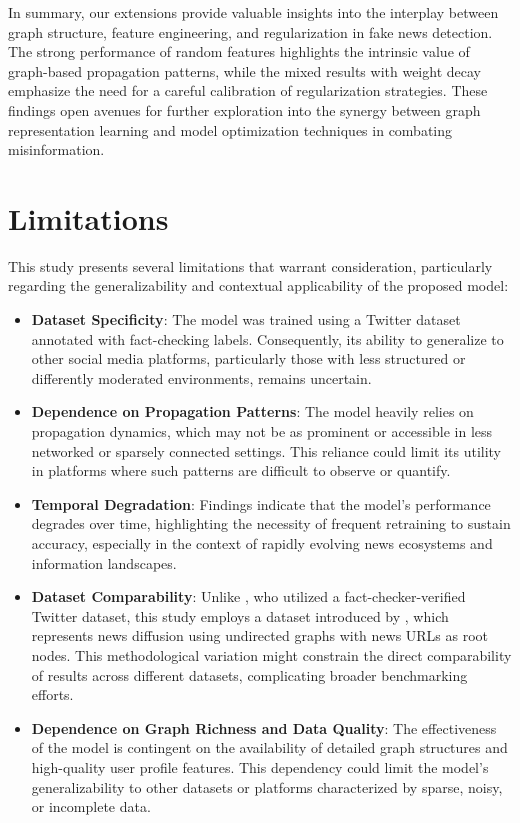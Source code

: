 \documentclass[sigconf,nonacm]{acmart}
\begin{document}
\vspace{1em} %

In summary, our extensions provide valuable insights into the interplay between graph structure, feature engineering, and regularization in fake news detection. The strong performance of random features highlights the intrinsic value of graph-based propagation patterns, while the mixed results with weight decay emphasize the need for a careful calibration of regularization strategies. These findings open avenues for further exploration into the synergy between graph representation learning and model optimization techniques in combating misinformation.



\section{Limitations}

This study presents several limitations that warrant consideration, particularly regarding the generalizability and contextual applicability of the proposed model:

\begin{itemize}
    \item \textbf{Dataset Specificity}: The model was trained using a Twitter dataset annotated with fact-checking labels. Consequently, its ability to generalize to other social media platforms, particularly those with less structured or differently moderated environments, remains uncertain.

    \item \textbf{Dependence on Propagation Patterns}: The model heavily relies on propagation dynamics, which may not be as prominent or accessible in less networked or sparsely connected settings. This reliance could limit its utility in platforms where such patterns are difficult to observe or quantify.

    \item \textbf{Temporal Degradation}: Findings indicate that the model's performance degrades over time, highlighting the necessity of frequent retraining to sustain accuracy, especially in the context of rapidly evolving news ecosystems and information landscapes.

    \item \textbf{Dataset Comparability}: Unlike \cite{monti2019fakenewsdetectionsocial}, who utilized a fact-checker-verified Twitter dataset, this study employs a dataset introduced by \cite{10.1145/3404835.3462990}, which represents news diffusion using undirected graphs with news URLs as root nodes. This methodological variation might constrain the direct comparability of results across different datasets, complicating broader benchmarking efforts.

    \item \textbf{Dependence on Graph Richness and Data Quality}: The effectiveness of the model is contingent on the availability of detailed graph structures and high-quality user profile features. This dependency could limit the model’s generalizability to other datasets or platforms characterized by sparse, noisy, or incomplete data.
\end{itemize}
\end{document}
